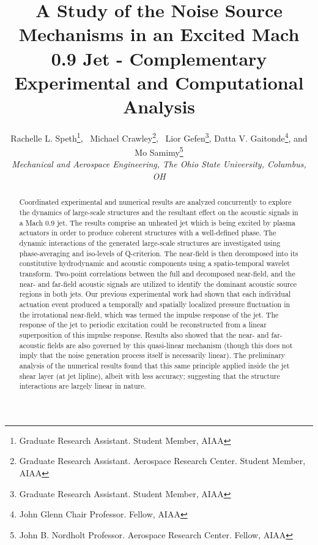 \documentclass[english]{aiaa-tc}
\begin{document}
\title{A Study of the Noise Source Mechanisms in an Excited Mach 0.9 Jet - Complementary Experimental and Computational Analysis}


\author{Rachelle L. Speth\thanks{Graduate Research Assistant. Student Member, AIAA}, \
Michael Crawley\thanks{Graduate Research Assistant. Aerospace Research Center. Student Member, AIAA}, \
Lior Gefen\thanks{Graduate Research Assistant. Student Member, AIAA},
 Datta V. Gaitonde\thanks{John Glenn Chair Professor. Fellow, AIAA},
 and Mo Samimy\thanks{John B. Nordholt Professor. Aerospace Research Center. Fellow, AIAA}
\\\normalsize\itshape Mechanical and Aerospace Engineering, The Ohio State University, Columbus, OH \\}


\maketitle

\begin{abstract}
Coordinated experimental and numerical results are analyzed concurrently to explore the dynamics of large-scale structures and the resultant effect on the acoustic signals in a Mach 0.9 jet. 
The results comprise an unheated jet which is being excited by plasma actuators in order to produce coherent structures with a well-defined phase. 
The dynamic interactions of the generated large-scale structures are investigated using phase-averaging and iso-levels of Q-criterion. 
The near-field is then decomposed into its constitutive hydrodynamic and acoustic components using a spatio-temporal wavelet transform. 
Two-point correlations between the full and decomposed near-field, and the near- and far-field acoustic signals are utilized to identify the dominant acoustic source regions in both jets.
Our previous experimental work had shown that each individual actuation event produced a temporally and spatially localized pressure fluctuation in the irrotational near-field, which was termed the impulse response of the jet. The response of the jet to periodic excitation could be reconstructed from a linear superposition of this impulse response. 
Results also showed that the near- and far-acoustic fields are also governed by this quasi-linear mechanism (though this does not imply that the noise generation process itself is necessarily linear). 
The preliminary analysis of the numerical results found that this same principle applied inside the jet shear layer (at jet lipline), albeit with less accuracy; suggesting that the structure interactions are largely linear in nature. 

\end{abstract}
\end{document}
